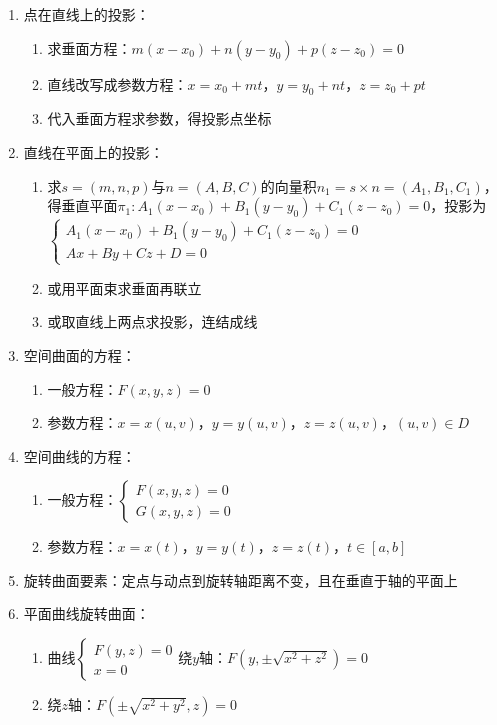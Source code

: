 \documentclass[UTF8]{ctexart}
\theoremstyle{remark}
\begin{document}
\begin{enumerate}
\item 点在直线上的投影：
\begin{enumerate}
	\item 求垂面方程：\(m(x - x_0) + n(y - y_0) + p(z - z_0) = 0\)
	\item 直线改写成参数方程：\(x = x_0 + mt\)，\(y = y_0 + nt\)，\(z = z_0 + pt\)
	\item 代入垂面方程求参数，得投影点坐标
\end{enumerate}

\item 直线在平面上的投影：
\begin{enumerate}
	\item 求\(s = (m, n, p)\)与\(n = (A, B, C)\)的向量积\(n_1 = s \times n = (A_1, B_1, C_1)\)，得垂直平面\(\pi_1: A_1(x - x_0) + B_1(y - y_0) + C_1(z - z_0) = 0\)，投影为\(\begin{cases} A_1(x - x_0) + B_1(y - y_0) + C_1(z - z_0) = 0 \\ Ax + By + Cz + D = 0 \end{cases}\)
	\item 或用平面束求垂面再联立
	\item 或取直线上两点求投影，连结成线
\end{enumerate}

\item 空间曲面的方程：
\begin{enumerate}
	\item 一般方程：\(F(x, y, z) = 0\)
	\item 参数方程：\(x = x(u, v)\)，\(y = y(u, v)\)，\(z = z(u, v)\)，\((u, v) \in D\)
\end{enumerate}

\item 空间曲线的方程：
\begin{enumerate}
	\item 一般方程：\(\begin{cases} F(x, y, z) = 0 \\ G(x, y, z) = 0 \end{cases}\)
	\item 参数方程：\(x = x(t)\)，\(y = y(t)\)，\(z = z(t)\)，\(t \in [a, b]\)
\end{enumerate}

\item 旋转曲面要素：定点与动点到旋转轴距离不变，且在垂直于轴的平面上

\item 平面曲线旋转曲面：
\begin{enumerate}
	\item 曲线\(\begin{cases} F(y, z) = 0 \\ x = 0 \end{cases}\)绕\(y\)轴：\(F(y, \pm\sqrt{x^2 + z^2}) = 0\)
	\item 绕\(z\)轴：\(F(\pm\sqrt{x^2 + y^2}, z) = 0\)
\end{enumerate}


\end{enumerate}
\end{document}

